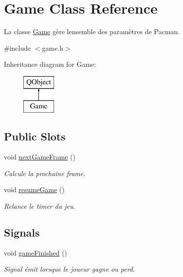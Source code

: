 \hypertarget{class_game}{}\section{Game Class Reference}
\label{class_game}


La classe \hyperlink{class_game}{Game} gère l\textquotesingle{}ensemble des paramètres de Pacman.  




{\ttfamily \#include $<$game.\+h$>$}

Inheritance diagram for Game\+:\begin{figure}[H]
\begin{center}
\leavevmode
\includegraphics[height=2.000000cm]{class_game}
\end{center}
\end{figure}
\subsection*{Public Slots}
\begin{DoxyCompactItemize}
\item 
\hypertarget{class_game_a3c0e737b028fae5e5fc323efe6326880}{}void \hyperlink{class_game_a3c0e737b028fae5e5fc323efe6326880}{next\+Game\+Frame} ()\label{class_game_a3c0e737b028fae5e5fc323efe6326880}

\begin{DoxyCompactList}\small\item\em Calcule la prochaine frame. \end{DoxyCompactList}\item 
\hypertarget{class_game_a5ec2daf2a7fe95ee03dea84b4f5d6883}{}void \hyperlink{class_game_a5ec2daf2a7fe95ee03dea84b4f5d6883}{resume\+Game} ()\label{class_game_a5ec2daf2a7fe95ee03dea84b4f5d6883}

\begin{DoxyCompactList}\small\item\em Relance le timer du jeu. \end{DoxyCompactList}\end{DoxyCompactItemize}
\subsection*{Signals}
\begin{DoxyCompactItemize}
\item 
\hypertarget{class_game_abb2334c12764f9b5d240315dc06e8698}{}void \hyperlink{class_game_abb2334c12764f9b5d240315dc06e8698}{game\+Finished} ()\label{class_game_abb2334c12764f9b5d240315dc06e8698}

\begin{DoxyCompactList}\small\item\em Signal émit lorsque le joueur gagne ou perd. \end{DoxyCompactList}\end{DoxyCompactItemize}
